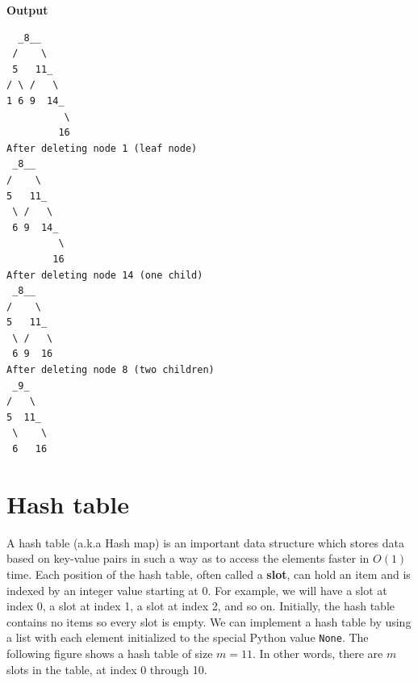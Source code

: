 \documentclass[a4paper,11pt]{book}
\begin{document}
\textbf{Output}
\begin{lstlisting}
  _8__     
 /    \    
 5   11_   
/ \ /   \  
1 6 9  14_ 
          \
         16
After deleting node 1 (leaf node)
 _8__     
/    \    
5   11_   
 \ /   \  
 6 9  14_ 
         \
        16
After deleting node 14 (one child)
 _8__   
/    \  
5   11_ 
 \ /   \
 6 9  16
After deleting node 8 (two children)
 _9_   
/   \  
5  11_ 
 \    \
 6   16
\end{lstlisting}

\newpage
\section{Hash table}






\noindent A hash table (a.k.a Hash map) is an important data structure which stores data based on key-value pairs in such a way as to access the elements faster in $O(1)$ time. Each position of the hash table, often called a \textbf{slot}, can hold an item and is indexed by an integer value starting at 0. For example, we will have a slot at index 0, a slot at index 1, a slot at index 2, and so on. Initially, the hash table contains no items so every slot is empty. We can implement a hash table by using a list with each element initialized to the special Python value \lstinline{None}. The following figure shows a hash table of size $m=11$. In other words, there are $m$ slots in the table, at index 0 through 10.
\end{document}
